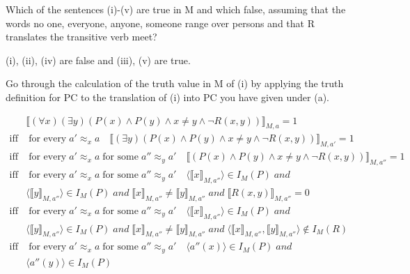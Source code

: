 \begin{QandA}
\begin{QandA}
		\begin{QandA}
			\item Which of the sentences (i)-(v) are true in M and which false, assuming that the words 
			no one, everyone, anyone, someone range over persons and that R translates the transitive verb meet?
			\begin{answered}
				(i), (ii), (iv) are false and (iii), (v) are true.
			\end{answered}
			\item Go through the calculation of the truth value in M of (i) by applying the truth definition for PC to the translation of (i) into PC you have given under (a).
			\begin{answered}
				\begin{align*}
				 & \llbracket (\forall x)(\exists y)(P(x) \land P(y) \land x \ne y \land \neg R(x,y)) \rrbracket_{M,a} = 1  \\
				\text{iff} & \; \text{for every} \; a' \approx_{x} a \quad \llbracket (\exists y)(P(x) \land P(y) \land x \ne y \land \neg R(x,y)) \rrbracket_{M,a'} = 1 \\
				\text{iff} & \; \text{for every} \; a' \approx_{x} a \; \text{for some} \; a'' \approx_{y} a' \quad \llbracket (P(x) \land P(y) \land x \ne y \land \neg R(x,y)) \rrbracket_{M,a''} = 1 \\
				\text{iff} &\; \text{for every} \; a' \approx_{x} a \; \text{for some} \; a'' \approx_{y} a' \quad 
				\langle \llbracket x \rrbracket_{M,a''} \rangle \in I_{M}(P) \; and \; \\
				& \langle \llbracket y \rrbracket_{M,a''} \rangle \in I_{M}(P)
				\; and \;  \llbracket x \rrbracket_{M,a''} \ne \llbracket y \rrbracket_{M,a''} \; and \; \llbracket R(x,y) \rrbracket_{M,a''} = 0 \\
				\text{iff} &\; \text{for every} \; a' \approx_{x} a \; \text{for some} \; a'' \approx_{y} a' \quad 
				\langle \llbracket x \rrbracket_{M,a''} \rangle \in I_{M}(P) \; and \; \\
				& \langle \llbracket y \rrbracket_{M,a''} \rangle \in I_{M}(P)
				\; and \;  \llbracket x \rrbracket_{M,a''} \ne \llbracket y \rrbracket_{M,a''} \; and \; 
				\langle \llbracket x \rrbracket_{M,a''}, \llbracket y \rrbracket_{M,a''} \rangle \not\in I_{M}(R) \\
				\text{iff} &\; \text{for every} \; a' \approx_{x} a \; \text{for some} \; a'' \approx_{y} a' \quad 
				\langle a''(x) \rangle \in I_{M}(P) \; and \; \\
				& \langle a''(y) \rangle \in I_{M}(P)

\end{align*}
\end{answered}
\end{QandA}
\end{QandA}
\end{QandA}
